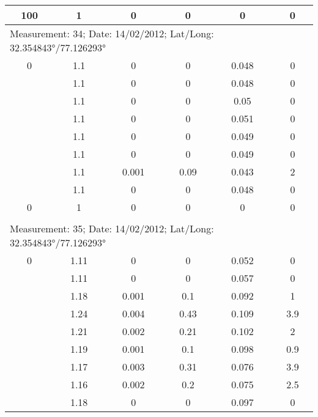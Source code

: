 \begin{longtable}{cccccc}
		100   & 1     & 0     & 0     & 0     & 0 \\
		\midrule
		\multicolumn{6}{l}{Measurement: 34; Date: 14/02/2012;
			Lat/Long: 32.354843°/77.126293°} \\		
		\midrule
		0     & 1.1   & 0     & 0     & 0.048 & 0 \\
		
		& 1.1   & 0     & 0     & 0.048 & 0 \\
		
		& 1.1   & 0     & 0     & 0.05  & 0 \\
		
		& 1.1   & 0     & 0     & 0.051 & 0 \\
		
		& 1.1   & 0     & 0     & 0.049 & 0 \\
		
		& 1.1   & 0     & 0     & 0.049 & 0 \\
		
		& 1.1   & 0.001 & 0.09  & 0.043 & 2 \\
		
		& 1.1   & 0     & 0     & 0.048 & 0 \\
		
		0     & 1     & 0     & 0     & 0     & 0 \\ \\
		\multicolumn{6}{l}{Measurement: 35; Date: 14/02/2012;
			Lat/Long: 32.354843°/77.126293°} \\		
		\midrule
		0     & 1.11  & 0     & 0     & 0.052 & 0 \\
		
		& 1.11  & 0     & 0     & 0.057 & 0 \\
		
		& 1.18  & 0.001 & 0.1   & 0.092 & 1 \\
		
		& 1.24  & 0.004 & 0.43  & 0.109 & 3.9 \\
		
		& 1.21  & 0.002 & 0.21  & 0.102 & 2 \\
		
		& 1.19  & 0.001 & 0.1   & 0.098 & 0.9 \\
		
		& 1.17  & 0.003 & 0.31  & 0.076 & 3.9 \\
		
		& 1.16  & 0.002 & 0.2   & 0.075 & 2.5 \\
		
		& 1.18  & 0     & 0     & 0.097 & 0 \\
		

\end{longtable}
